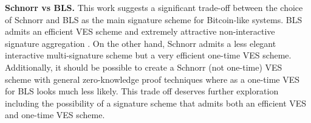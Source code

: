 \hfill \break \textbf{Schnorr vs BLS.} This work suggests a significant trade-off between the choice of Schnorr and BLS as the main signature scheme for Bitcoin-like systems. BLS admits an efficient VES scheme\cite{Boneh:2003:AVE:1766171.1766207} and extremely attractive non-interactive signature aggregation \cite{compact-blockchains-bls}. On the other hand, Schnorr admits a less elegant interactive multi-signature scheme\cite{musig} but a very efficient one-time VES scheme. Additionally, it should be possible to create a Schnorr (not one-time) VES scheme with general zero-knowledge proof techniques where as a one-time VES for BLS looks much less likely. This trade off deserves further exploration including  the possibility of a signature scheme that admits both an efficient VES and one-time VES scheme.
